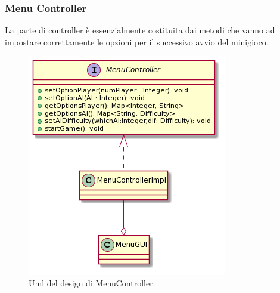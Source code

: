 \documentclass[a4paper,12pt]{report}
\begin{document}
	\subsubsection{Menu Controller}
	La parte di controller è essenzialmente costituita dai metodi che vanno ad impostare correttamente le opzioni per il successivo avvio del minigioco.
    	\begin{figure}[h]
    	\centering{}
    	\includegraphics[width=\textwidth]{images/squarcialupi/MenuController.png}
    	\caption{Uml del design di MenuController.}
    \newline
    \label{img:MenuController}
    \end{figure}
\end{document}
